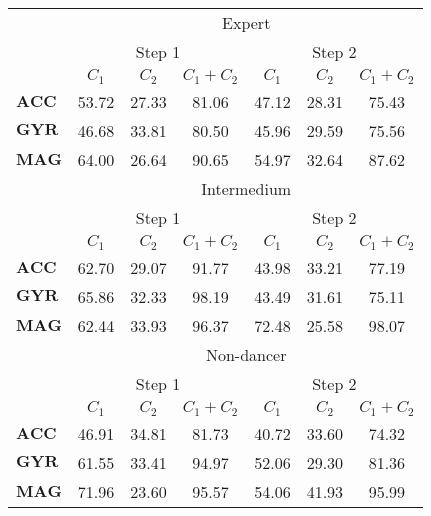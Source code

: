 \documentclass{sigchi}
\begin{document}
\begin{table}
\tiny

  \centering
  
\begin{tabular}{l c c c c c c }
\toprule



& \multicolumn{6}{c}{Expert} \\
\cmidrule(r){2-7}

& \multicolumn{3}{c}{Step 1} & \multicolumn{3}{c}{Step 2}\\
\cmidrule(lr){2-4} \cmidrule(lr){5-7}

     & $C_1$ & $C_2$  & $C_1+C_2$  & $C_1$  & $C_2$  & $C_1+C_2$  \\
\midrule

$\boldsymbol{ACC}$ & 53.72 & 27.33 & 81.06 & 47.12 & 28.31 & 75.43 \\
$\boldsymbol{GYR}$ & 46.68 & 33.81 & 80.50 & 45.96 & 29.59 & 75.56 \\
$\boldsymbol{MAG}$ &64.00 & 26.64 & \cellcolor{blue!25}90.65 & 54.97 & 32.64 & \cellcolor{blue!25}87.62 \\


& \multicolumn{6}{c}{Intermedium} \\
\cmidrule(r){2-7}

& \multicolumn{3}{c}{Step 1} & \multicolumn{3}{c}{Step 2}\\
\cmidrule(lr){2-4} \cmidrule(lr){5-7}

     & $C_1$ & $C_2$  & $C_1+C_2$  & $C_1$  & $C_2$  & $C_1+C_2$  \\
\midrule
$\boldsymbol{ACC}$ & 62.70 & 29.07 & 91.77 & 43.98 & 33.21 & 77.19 \\
$\boldsymbol{GYR}$ & 65.86 & 32.33 & \cellcolor{blue!25}98.19 & 43.49 & 31.61 & 75.11 \\
$\boldsymbol{MAG}$ & 62.44 & 33.93 & 96.37 & 72.48 & 25.58 & \cellcolor{blue!25}98.07 \\


& \multicolumn{6}{c}{Non-dancer} \\
\cmidrule(r){2-7}

& \multicolumn{3}{c}{Step 1} & \multicolumn{3}{c}{Step 2}\\
\cmidrule(lr){2-4} \cmidrule(lr){5-7}

     & $C_1$ & $C_2$  & $C_1+C_2$  & $C_1$  & $C_2$  & $C_1+C_2$  \\
\midrule
$\boldsymbol{ACC}$ & 46.91 & 34.81 & 81.73 & 40.72 & 33.60 & 74.32 \\
$\boldsymbol{GYR}$ & 61.55 & 33.41 & 94.97 & 52.06 & 29.30 & 81.36 \\
$\boldsymbol{MAG}$ & 71.96 & 23.60 & \cellcolor{blue!25}95.57 & 54.06 & 41.93 & \cellcolor{blue!25}95.99 \\


\end{tabular}
\end{table}
\end{document}
